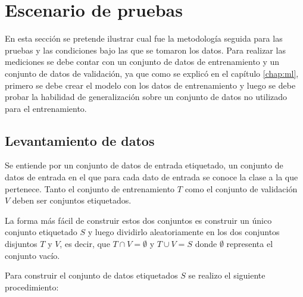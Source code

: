 \documentclass[a4paper, 11pt, oneside]{report}
\begin{document}
\section{Escenario de pruebas}
\label{sect:testEnvironment}

En esta sección se pretende ilustrar cual fue la metodología seguida para las pruebas y las condiciones bajo las que se tomaron los datos. Para realizar las mediciones se debe contar con un conjunto de datos de entrenamiento y un conjunto de datos de validación, ya que como se explicó en el capítulo \ref{chap:ml}, primero se debe crear el modelo con los datos de entrenamiento y luego se debe probar la habilidad de generalización sobre un conjunto de datos no utilizado para el entrenamiento.

\subsection{Levantamiento de datos}

Se entiende por un conjunto de datos de entrada etiquetado, un conjunto de datos de entrada en el que para cada dato de entrada se conoce la clase a la que pertenece. Tanto el conjunto de entrenamiento $T$ como el conjunto de validación $V$ deben ser conjuntos etiquetados.

La forma más fácil de construir estos dos conjuntos es construir un único conjunto etiquetado $S$ y luego dividirlo aleatoriamente en los dos conjuntos disjuntos $T$ y $V$, es decir, que $T \cap V = \emptyset$ y $T \cup V = S$ donde $\emptyset$ representa el conjunto vacío.

Para construir el conjunto de datos etiquetados $S$ se realizo el siguiente procedimiento:
\end{document}
